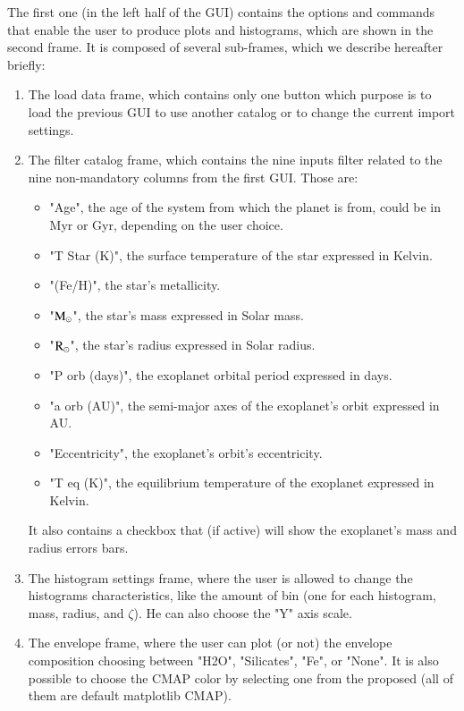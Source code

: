 \documentclass[preprint,12pt]{elsarticle}
\begin{document}
            The first one (in the left half of the GUI) contains the options and commands that enable the user to produce plots and histograms, which are shown in the second frame.   
            It is composed of several sub-frames, which we describe hereafter briefly:
            \begin{enumerate}
                \item The load data frame, which contains only one button which purpose is to load the previous GUI to use another catalog or to change the current import settings.
                \item The filter catalog frame, which contains the nine inputs filter related to the nine non-mandatory columns from the first GUI. Those are:
                \begin{itemize}
                    \item "Age", the age of the system from which the planet is from, could be in Myr or Gyr, depending on the user choice.
                    \item "T Star (K)", the surface temperature of the star expressed in Kelvin.
                    \item "(Fe/H)", the star's metallicity.
                    \item "\(\textup{M}_\odot\)", the star's mass expressed in Solar mass.
                    \item "\(\textup{R}_\odot\)", the star's radius expressed in Solar radius.
                    \item "P orb (days)", the exoplanet orbital period expressed in days.
                    \item "a orb (AU)", the semi-major axes of the exoplanet's orbit expressed in AU.
                    \item "Eccentricity", the exoplanet's orbit's eccentricity.
                    \item "T eq (K)", the equilibrium temperature of the exoplanet expressed in Kelvin.
                \end{itemize}
                It also contains a checkbox that (if active) will show the exoplanet's mass and radius errors bars.
                \item The histogram settings frame, where the user is allowed to change the histograms characteristics, like the amount of bin (one for each histogram, mass, radius, and $\zeta$). He can also choose the "Y" axis scale.
                \item The envelope frame, where the user can plot (or not) the envelope composition choosing between "H2O", "Silicates", "Fe", or "None". It is also possible to choose the CMAP color by selecting one from the proposed (all of them are default matplotlib CMAP).

\end{enumerate}
\end{document}
